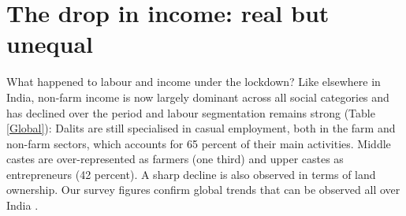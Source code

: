 \documentclass[a4paper, 11pt, onecolumn]{article}
\begin{document}
\section{The drop in income: real but unequal}
\label{section:income}

What happened to labour and income under the lockdown? Like elsewhere in India, non-farm income is now largely dominant across all social categories and has declined over the period and labour segmentation remains strong (Table \ref{Global}): Dalits are still specialised in casual  employment, both in the farm and non-farm sectors, which accounts for 65 percent of their main activities.
Middle castes are over-represented as farmers (one third) and upper castes as entrepreneurs (42 percent). 
A sharp decline is also observed in terms of land ownership. Our survey figures confirm global trends that can be observed all over India \citep{Lerche2009, Himanshu2011, Landy2018}. 
\end{document}
